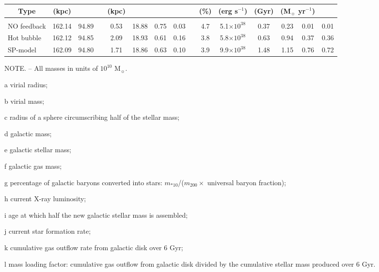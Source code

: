 \begin{table*}
\begin{threeparttable}
\begin{tabular}{@{\ \ }l@{\ \ \ }c@{ \ }c@{\ \ }c@{\ \ \ \ \ }c@{ \ }c@{ \ }c@{ \ }c@{\ \ }c@{\ \ \ \ \ }c@{ \ }c@{ \ }c@{ \ }c@{\ \ \ }c@{\ \ \ }c@{\ \ }}
\multicolumn{1}{c}{Type} & (kpc) & & & (kpc) & & & & &(\%) & (erg s$^{-1}$)  & (Gyr) & \multicolumn{2}{c}{(M$_{\sun}$ yr$^{-1}$)} & \\[0.05 in]
\hline
\\[-1.5mm]
NO feedback & 162.14 & 94.89 & & 0.53 & 18.88 & 0.75 & 0.03 & & 4.7 & 5.1$\times 10^{38}$ & 0.37 & 0.23 & 0.01 & 0.01\\
Hot bubble  & 162.12 & 94.85 & & 2.09 & 18.93 & 0.61 & 0.16 & & 3.8 & 5.8$\times 10^{38}$ & 0.63 & 0.94 & 0.37 & 0.36\\
SP-model    & 162.09 & 94.80 & & 1.71 & 18.86 & 0.63 & 0.10 & & 3.9 & 9.9$\times 10^{38}$ & 1.48 & 1.15 & 0.76 & 0.72\\[2mm]
\hline\hline
\end{tabular}
\begin{tablenotes}
NOTE. -- All masses in units of $10^{10}$ M$_{\sun}$.
\item[a] virial radius; \item[b] virial mass; \item[c] radius of a sphere circumscribing half of the stellar mass; \item[d] galactic mass; \item[e] galactic stellar mass; \item[f] galactic gas mass; \item[g] percentage of galactic baryons converted into stars: $m_{*10}$/($m_{200}\times$ universal baryon fraction);  \item[h] current X-ray luminosity; \item[i] age at which half the new galactic stellar mass is assembled; \item[j] current star formation rate; \item[k] cumulative gas outflow rate from galactic disk over 6 Gyr; \item[l] mass loading factor: cumulative gas outflow from galactic disk divided by the cumulative stellar mass produced over 6 Gyr.
\end{tablenotes}
\end{threeparttable}
\end{table*}
